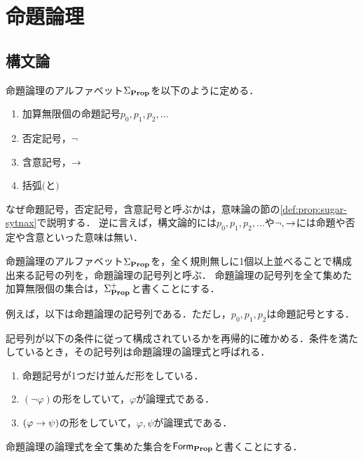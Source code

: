 \documentclass[a4paper]{jsarticle}
\title{\myTitle}
\author{\myAuthor}
\begin{document}
\maketitle

\section{命題論理}

\subsection{構文論}

\begin{myDefinition}
  命題論理のアルファベット$\Sigma_{\mathbf{Prop}}$を以下のように定める．
  \begin{enumerate}
    \item 加算無限個の命題記号$p_0,p_1,p_2,\dots$
    \item 否定記号，$\neg$
    \item 含意記号，$\to$
    \item 括弧$($と$)$
  \end{enumerate}
\end{myDefinition}

\begin{myRemark}
  なぜ命題記号，否定記号，含意記号と呼ぶかは，意味論の節の\ref{def:prop:sugar-sytnax}で説明する．
  逆に言えば，構文論的には$p_0,p_1,p_2,\dots$や$\neg,\to$には命題や否定や含意といった意味は無い．
\end{myRemark}

\begin{myDefinition}[命題論理の記号列]
  命題論理のアルファベット$\Sigma_{\mathbf{Prop}}$を，全く規則無しに1個以上並べることで構成出来る記号の列を，命題論理の記号列と呼ぶ．
  命題論理の記号列を全て集めた加算無限個の集合は，$\Sigma_{\mathbf{Prop}}^+$と書くことにする．
\end{myDefinition}

\begin{myExample}[命題論理の記号列の例]
  例えば，以下は命題論理の記号列である．ただし，$p_0,p_1,p_2$は命題記号とする．
\end{myExample}

\begin{myDefinition}[命題論理の論理式]
  記号列が以下の条件に従って構成されているかを再帰的に確かめる．条件を満たしているとき，その記号列は命題論理の論理式と呼ばれる．
  \begin{enumerate}
    \item 命題記号が1つだけ並んだ形をしている．
    \item $(\neg \varphi)$の形をしていて，$\varphi$が論理式である．
    \item $(\varphi \to \psi)$の形をしていて，$\varphi, \psi$が論理式である．
  \end{enumerate}
  命題論理の論理式を全て集めた集合を$\mathsf{Form}_{\mathbf{Prop}}$と書くことにする．
\end{myDefinition}
\end{document}
